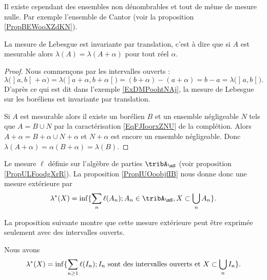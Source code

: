 \begin{remark}
    Il existe cependant des ensembles non dénombrables et tout de même de mesure nulle. Par exemple l'ensemble de Cantor (voir la proposition \ref{PropBEWooXZdKN}).
\end{remark}


\begin{proposition}
    La mesure de Lebesgue est invariante par translation, c'est à dire que si \( A\) est mesurable alors \( \lambda(A)=\lambda(A+\alpha)\) pour tout réel \( \alpha\).
\end{proposition}

\begin{proof}
    Nous commençons par les intervalles ouverts :
    \begin{equation}
    \lambda\big( \mathopen] a , b \mathclose[+\alpha \big)=\lambda\big( \mathopen] a+\alpha , b+\alpha \mathclose[ \big)=(b+\alpha)-(a+\alpha)=b-a=\lambda\big( \mathopen] a , b \mathclose[ \big).
    \end{equation}
    D'après ce qui est dit dans l'exemple \ref{ExDMPoohtNAj}, la mesure de Lebesgue sur les boréliens est invariante par translation.

    Si \( A\) est mesurable alors il existe un borélien \( B\) et un ensemble négligeable \( N\) tels que \( A=B\cup N\) par la caractérisation \ref{EqFJIoorxZNU} de la complétion. Alors \( A+\alpha=B+\alpha\cup N+\alpha\) et \( N+\alpha\) est encore un ensemble négligeable. Donc \( \lambda(A+\alpha)=\alpha(B+\alpha)=\lambda(B)\).
\end{proof}

Le mesure \( \ell\) définie sur l'algèbre de parties \( \tribA_{\mS}\) (voir proposition \ref{PropULFoodgXrR}). La proposition \ref{PropIUOoobjfIB} nous donne donc une mesure extérieure par
\begin{equation}    \label{EqJGXoogdKqb}
    \lambda^*(X)=\inf\{ \sum_n\ell(A_n);A_n\in\tribA_{\mS},X\subset\bigcup_nA_n \}.
\end{equation}

La proposition suivante montre que cette mesure extérieure peut être exprimée seulement avec des intervalles ouverts.
\begin{proposition} \label{PropTNOooDcfwn}
    Nous avons
    \begin{equation}
        \lambda^*(X)=\inf\{ \sum_{n\geq 1}\ell(I_n);\text{\( I_n\) sont des intervalles ouverts et }X\subset\bigcup_nI_n \}.
    \end{equation}
\end{proposition}

